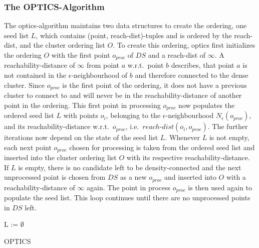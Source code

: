\subsubsection*{The OPTICS-Algorithm} %
The \gls{optics}-algorithm maintains two data structures to create the ordering, one seed list $L$, which contains (point, reach-dist)-tuples and is ordered by the reach-dist, and the cluster ordering list $O$. 
To create this ordering, \gls{optics} first initializes the ordering $O$ with the first point $o_{proc}$ of $DS$ and a reach-dist of $\infty$. A reachability-distance of $\infty$ from point $a$ w.r.t.\ point $b$ describes, that point $a$ is not contained in the $\epsilon$-neighbourhood of $b$ and therefore connected to the dense cluster. Since $o_{proc}$ is the first point of the ordering, it does not have a previous cluster to connect to and will never be in the reachability-distance of another point in the ordering. This first point in processing $o_{proc}$ now populates the ordered seed list $L$ with points $o_i$, belonging to the $\epsilon$-neighbourhood $N_\epsilon(o_{proc})$, and its reachability-distance w.r.t.\ $o_{proc}$, i.e.\ $reach$-$dist(o_i, o_{proc})$. The further iterations now depend on the state of the seed list $L$. Whenever $L$ is not empty, each next point $o_{proc}$ chosen for processing is taken from the ordered seed list and inserted into the cluster ordering list $O$ with its respective reachability-distance. If $L$ is empty, there is no candidate left to be density-connected and the next unprocessed point is chosen from $DS$ as a new $o_{proc}$ and inserted into $O$ with a reachability-distance of $\infty$ again. The point in process $o_{proc}$ is then used again to populate the seed list. This loop continues until there are no unprocessed points in $DS$ left.

\vspace{5mm}

\begin{algorithm}[H]
\SetAlgoLined
{}
 L := $\emptyset$\;
 \caption{OPTICS}
\end{algorithm}
\vspace{5mm}

